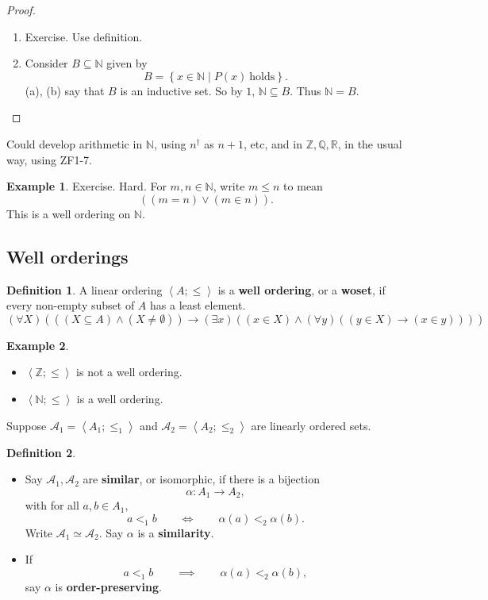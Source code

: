 \documentclass{article}
\newcommand{\N}{\mathbb{N}}
\newcommand{\Z}{\mathbb{Z}}
\newcommand{\Q}{\mathbb{Q}}
\newcommand{\R}{\mathbb{R}}
\newcommand{\A}{\mathcal{A}}
\newcommand{\rb}[1]{\left( #1 \right)}
\newcommand{\cb}[1]{\left\{ #1 \right\}}
\newcommand{\ab}[1]{\left\langle #1 \right\rangle}
\newcommand{\orb}[2]{\rb{#1 \lor #2}}
\newcommand{\andb}[2]{\rb{#1 \land #2}}
\newcommand{\impb}[2]{\rb{#1 \rightarrow #2}}
\newcommand{\fab}[1]{\rb{\forall #1}}
\newcommand{\teb}[1]{\rb{\exists #1}}
\newcommand{\eqb}[2]{\rb{#1 = #2}}
\newcommand{\neb}[2]{\rb{#1 \ne #2}}
\newcommand{\inb}[2]{\rb{#1 \in #2}}
\newcommand{\subb}[2]{\rb{#1 \subseteq #2}}
\theoremstyle{definition}\newtheorem{definition}{Definition}[subsection]
\theoremstyle{definition}\newtheorem{remark1}[definition]{Remark}
\theoremstyle{definition}\newtheorem{example1}[definition]{Example}
\theoremstyle{definition}\newtheorem*{remark2}{Remark}
\theoremstyle{definition}\newtheorem*{example2}{Example}
\theoremstyle{definition}\newtheorem*{note}{Note}
\theoremstyle{definition}\newtheorem*{notation}{Notation}
\begin{document}
\begin{proof}
\hfill
\begin{enumerate}
\item Exercise. Use definition.
\item Consider $ B \subseteq \N $ given by
$$ B = \cb{x \in \N \mid P\rb{x} \ \text{holds}}. $$
(a), (b) say that $ B $ is an inductive set. So by $ 1 $, $ \N \subseteq B $. Thus $ \N = B $.
\end{enumerate}
\end{proof}

Could develop arithmetic in $ \N $, using $ n^\dagger $ as $ n + 1 $, etc, and in $ \Z, \Q, \R $, in the usual way, using ZF1-7.

\begin{example2}
Exercise. Hard. For $ m, n \in \N $, write $ m \le n $ to mean
$$ \orb{\eqb{m}{n}}{\inb{m}{n}}. $$
This is a well ordering on $ \N $.
\end{example2}

\pagebreak

\subsection{Well orderings}

\begin{definition}
A linear ordering $ \ab{A; \le} $ is a \textbf{well ordering}, or a \textbf{woset}, if every non-empty subset of $ A $ has a least element.
$$ \fab{X}\impb{\andb{\subb{X}{A}}{\neb{X}{\emptyset}}}{\teb{x}\andb{\inb{x}{X}}{\fab{y}\impb{\inb{y}{X}}{\inb{x}{y}}}} $$
\end{definition}

\begin{example2}
\hfill
\begin{itemize}
\item $ \ab{\Z; \le} $ is not a well ordering.
\item $ \ab{\N; \le} $ is a well ordering.
\end{itemize}
\end{example2}


Suppose $ \A_1 = \ab{A_1; \le_1} $ and $ \A_2 = \ab{A_2; \le_2} $ are linearly ordered sets.

\begin{definition}
\hfill
\begin{itemize}
\item Say $ \A_1, \A_2 $ are \textbf{similar}, or isomorphic, if there is a bijection
$$ \alpha : A_1 \to A_2, $$
with for all $ a, b \in A_1 $,
$$ a <_1 b \qquad \iff \qquad \alpha\rb{a} <_2 \alpha\rb{b}. $$
Write $ \A_1 \simeq \A_2 $. Say $ \alpha $ is a \textbf{similarity}.
\item If
$$ a <_1 b \qquad \implies \qquad \alpha\rb{a} <_2 \alpha\rb{b}, $$
say $ \alpha $ is \textbf{order-preserving}.
\end{itemize}
\end{definition}
\end{document}
